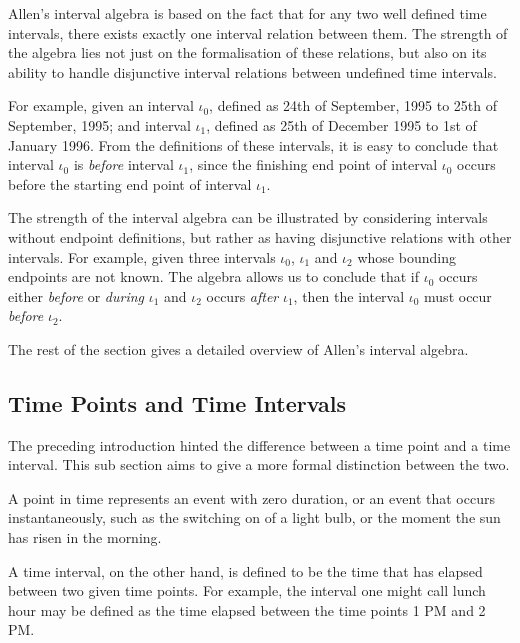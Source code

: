 \documentclass[11pt]{report}
\begin{document}
      Allen's interval algebra \cite{ALE} is based on the fact that for any
      two well defined time intervals, there exists exactly one interval
      relation between them. The strength of the algebra lies not just on
      the formalisation of these relations, but also on its ability to handle
      disjunctive interval relations between undefined time intervals.

      For example, given an interval $\iota_0$, defined as 24th of September,
      1995 to 25th of September, 1995; and interval $\iota_1$, defined as 25th
      of December 1995 to 1st of January 1996. From the definitions of these
      intervals, it is easy to conclude that interval $\iota_0$ is {\em before}
      interval $\iota_1$, since the finishing end point of interval $\iota_0$
      occurs before the starting end point of interval $\iota_1$.

      The strength of the interval algebra can be illustrated by considering
      intervals without endpoint definitions, but rather as having disjunctive
      relations with other intervals. For example, given three intervals
      $\iota_0$, $\iota_1$ and $\iota_2$ whose bounding endpoints are not
      known. The algebra allows us to conclude that if $\iota_0$ occurs either
      {\em before} or {\em during} $\iota_1$ and $\iota_2$ occurs {\em after}
      $\iota_1$, then the interval $\iota_0$ must occur {\em before} $\iota_2$.

      The rest of the section gives a detailed overview of Allen's interval
      algebra.

      \subsection{Time Points and Time Intervals}
        \label{subs-tempo-tpint}

        The preceding introduction hinted the difference between a time point
        and a time interval. This sub section aims to give a more formal
        distinction between the two.

        A point in time represents an event with zero duration, or an event
        that occurs instantaneously, such as the switching on of a light bulb,
        or the moment the sun has risen in the morning.

        A time interval, on the other hand, is defined to be the time that has
        elapsed between two given time points. For example, the interval one
        might call lunch hour may be defined as the time elapsed between the
        time points 1 PM and 2 PM.
\end{document}
